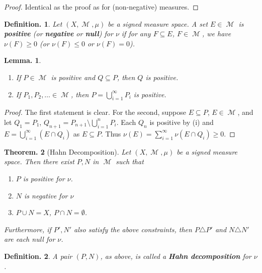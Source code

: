 \documentclass[11pt, a4paper]{memoir}
\theoremstyle{change}
\newtheorem{theorem}{Theorem.}[section]
\newtheorem{lemma}[theorem]{Lemma.}
\theoremstyle{plain}
\theoremstyle{nonumberplain}
\newtheorem{definition}{Definition.}
\newtheorem{proof}{Proof}
\DeclareMathOperator{\M}{{\mathcal{M}}}
\begin{document}
\begin{proof}
    Identical as the proof as for (non-negative) measures.
\end{proof}
\begin{definition}
    Let $(X,\M,\mu)$ be a signed measure space.
    A set $E\in\M$ is \textbf{positive} (or \textbf{negative} or \textbf{null}) for $\nu$ if for any $F\subseteq E$, $F\in\M$, we have $\nu(F)\geq 0$ (or $\nu(F)\leq 0$ or $\nu(F)=0$).
\end{definition}
\begin{lemma}
    \begin{enumerate}[nolistsep,label=(\roman*)]
        \item If $P\in\M$ is positive and $Q\subseteq P$, then $Q$ is positive.
        \item If $P_1,P_2,\ldots\in\M$, then $P=\bigcup_{i=1}^\infty P_i$ is positive.
    \end{enumerate}
\end{lemma}
\begin{proof}
    The first statement is clear.
    For the second, suppose $E\subseteq P$, $E\in\M$, and let $Q_1=P_1$, $Q_{n+1}=P_{n+1}\setminus\bigcup_{i=1}^n P_i$.
    Each $Q_n$ is positive by (i) and $E=\bigcup_{i=1}^\infty(E\cap Q_i)$ as $E\subseteq P$.
    Thus $\nu(E)=\sum_{i=1}^\infty\nu(E\cap Q_i)\geq 0$.
\end{proof}
\begin{theorem}[Hahn Decomposition]
    Let $(X,\M,\mu)$ be a signed measure space.
    Then there exist $P,N$ in $\M$ such that
    \begin{enumerate}[nolistsep,label=(\roman*)]
        \item $P$ is positive for $\nu$.
        \item $N$ is negative for $\nu$
        \item $P\cup N=X$, $P\cap N=\emptyset$.
    \end{enumerate}
    Furthermore, if $P',N'$ also satisfy the above constraints, then $P\triangle P'$ and $N\triangle N'$ are each null for $\nu$.
\end{theorem}
\begin{definition}
    A pair $(P,N)$, as above, is called a \textbf{Hahn decomposition} for $\nu$.
\end{definition}
\end{document}
